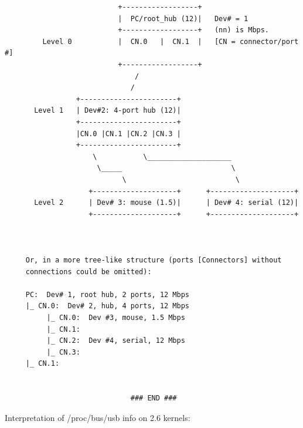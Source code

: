 \begin{verbatim}
                           +------------------+
                           |  PC/root_hub (12)|   Dev# = 1
                           +------------------+   (nn) is Mbps.
         Level 0           |  CN.0   |  CN.1  |   [CN = connector/port #]
                           +------------------+
                               /
                              /
                 +-----------------------+
       Level 1   | Dev#2: 4-port hub (12)|
                 +-----------------------+
                 |CN.0 |CN.1 |CN.2 |CN.3 |
                 +-----------------------+
                     \           \____________________
                      \_____                          \
                            \                          \
                    +--------------------+      +--------------------+
       Level 2      | Dev# 3: mouse (1.5)|      | Dev# 4: serial (12)|
                    +--------------------+      +--------------------+
     
     
     
     Or, in a more tree-like structure (ports [Connectors] without
     connections could be omitted):
     
     PC:  Dev# 1, root hub, 2 ports, 12 Mbps
     |_ CN.0:  Dev# 2, hub, 4 ports, 12 Mbps
          |_ CN.0:  Dev #3, mouse, 1.5 Mbps
          |_ CN.1:
          |_ CN.2:  Dev #4, serial, 12 Mbps
          |_ CN.3:
     |_ CN.1:
     
     
                              ### END ###
\end{verbatim}
\normalsize

Interpretation of /proc/bus/usb info on 2.6 kernels: 

